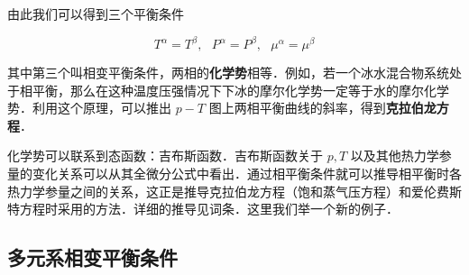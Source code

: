 由此我们可以得到三个平衡条件

\begin{equation}
T^\alpha=T^\beta,\ \ \ P^\alpha=P^\beta,\ \ \ \mu^\alpha=\mu^\beta
\end{equation}

其中第三个叫相变平衡条件，两相的\textbf{化学势}相等．例如，若一个冰水混合物系统处于相平衡，那么在这种温度压强情况下下冰的摩尔化学势一定等于水的摩尔化学势．利用这个原理，可以推出 $p-T$ 图上两相平衡曲线的斜率，得到\textbf{克拉伯龙方程}．

化学势可以联系到态函数：吉布斯函数．吉布斯函数关于 $p,T$ 以及其他热力学参量的变化关系可以从其全微分公式中看出．通过相平衡条件就可以推导相平衡时各热力学参量之间的关系，这正是推导克拉伯龙方程（饱和蒸气压方程）和爱伦费斯特方程时采用的方法．详细的推导见词条．这里我们举一个新的例子．

\subsection{多元系相变平衡条件}
